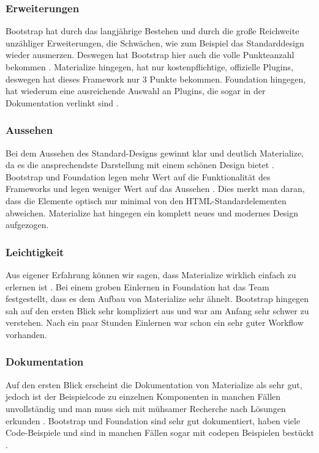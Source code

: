 \subsubsection{Erweiterungen}
\label{chapter:study-frontend-vergleich-erweiterungen}
Bootstrap hat durch das langjährige Bestehen und durch die große Reichweite unzähliger Erweiterungen, die Schwächen, wie zum Beispiel das Standarddesign wieder ausmerzen. Deswegen hat Bootstrap hier auch die volle Punkteanzahl bekommen \cite{introduction-bootstrap}. Materialize hingegen, hat nur kostenpflichtige, offizielle Plugins, deswegen hat dieses Framework nur 3 Punkte bekommen. Foundation hingegen, hat wiederum eine ausreichende Auswahl an Plugins, die sogar in der Dokumentation verlinkt sind \cite{foundation-webdocu}. 
\subsubsection{Aussehen}
\label{chapter:study-frontend-vergleich-aussehen}
Bei dem Aussehen des Standard-Designs gewinnt klar und deutlich Materialize, da es die ansprechendste Darstellung mit einem schönen Design bietet \cite{WebDocMaterialize}. Bootstrap und Foundation legen mehr Wert auf die Funktionalität des Frameworks und legen weniger Wert auf das Aussehen \cite{bootstrap-docu, foundation-webdocu}. Dies merkt man daran, dass die Elemente optisch nur minimal von den HTML-Standardelementen abweichen. Materialize hat hingegen ein komplett neues und modernes Design aufgezogen.
\subsubsection{Leichtigkeit}
\label{chapter:study-frontend-vergleich-leichtigkeit}
Aus eigener Erfahrung können wir sagen, dass Materialize wirklich einfach zu erlernen ist \cite{WebDocMaterialize}. Bei einem groben Einlernen in Foundation hat das Team festgestellt, dass es dem Aufbau von Materialize sehr ähnelt. Bootstrap hingegen sah auf den ersten Blick sehr kompliziert aus und war am Anfang sehr schwer zu verstehen. Nach ein paar Stunden Einlernen war schon ein sehr guter Workflow vorhanden.
\subsubsection{Dokumentation}
\label{chapter:study-frontend-vergleich-doku}
Auf den ersten Blick erscheint die Dokumentation von Materialize als sehr gut, jedoch ist der Beispielcode zu einzelnen Komponenten in manchen Fällen unvollständig und man muss sich mit mühsamer Recherche nach Lösungen erkunden \cite{WebDocMaterialize}. Bootstrap und Foundation sind sehr gut dokumentiert, haben viele Code-Beispiele und sind in manchen Fällen sogar mit \Gls{codepen} Beispielen bestückt \cite{bootstrap-docu, foundation-webdocu}.

